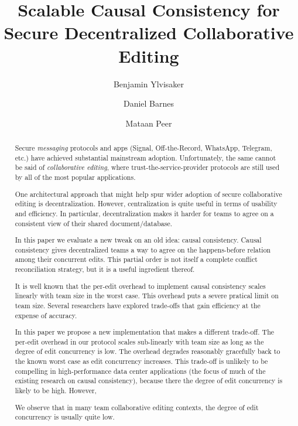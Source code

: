 \documentclass[runningheads]{llncs}
\begin{document}
\title{Scalable Causal Consistency for Secure Decentralized Collaborative Editing}

\author{Benjamin Ylvisaker \and Daniel Barnes \and Mataan Peer}


\maketitle

\begin{abstract}

Secure \emph{messaging} protocols and apps (Signal, Off-the-Record, WhatsApp, Telegram, etc.) have achieved substantial mainstream adoption.
Unfortunately, the same cannot be said of \emph{collaborative editing}, where trust-the-service-provider protocols are still used by all of the most popular applications.

One architectural approach that might help spur wider adoption of secure collaborative editing is decentralization.
However, centralization is quite useful in terms of usability and efficiency.
In particular, decentralization makes it harder for teams to agree on a consistent view of their shared document{\slash}database.

In this paper we evaluate a new tweak on an old idea: causal consistency.
Causal consistency gives decentralized teams a way to agree on the happens-before relation among their concurrent edits.
This partial order is not itself a complete conflict reconciliation strategy, but it is a useful ingredient thereof.

It is well known that the per-edit overhead to implement causal consistency scales linearly with team size in the worst case.
This overhead puts a severe pratical limit on team size.
Several researchers have explored trade-offs that gain efficiency at the expense of accuracy.

In this paper we propose a new implementation that makes a different trade-off.
The per-edit overhead in our protocol scales sub-linearly with team size as long as the degree of edit concurrency is low.
The overhead degrades reasonably gracefully back to the known worst case as edit concurrency increases.
This trade-off is unlikely to be compelling in high-performance data center applications (the focus of much of the existing research on causal consistency), because there the degree of edit concurrency is likely to be high.
However, 

We observe that in many team collaborative editing contexts, the degree of edit concurrency is usually quite low.


\end{abstract}
\end{document}
